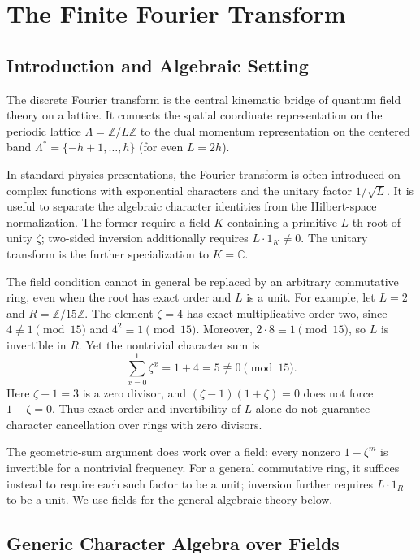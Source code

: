\chapter{The Finite Fourier Transform}
\label{ch:fourier}

\section{Introduction and Algebraic Setting}

The discrete Fourier transform is the central kinematic bridge of quantum field theory on a lattice. It connects the spatial coordinate representation on the periodic lattice $\Lambda = \mathbb{Z}/L\mathbb{Z}$ to the dual momentum representation on the centered band $\Lambda^* = \{-h+1, \dots, h\}$ (for even $L = 2h$).

In standard physics presentations, the Fourier transform is often introduced on complex functions with exponential characters and the unitary factor $1/\sqrt{L}$. It is useful to separate the algebraic character identities from the Hilbert-space normalization. The former require a field $K$ containing a primitive $L$-th root of unity $\zeta$; two-sided inversion additionally requires $L\cdot1_K\ne0$. The unitary transform is the further specialization to $K=\mathbb C$.

The field condition cannot in general be replaced by an arbitrary commutative ring, even when the root has exact order and $L$ is a unit. For example, let $L=2$ and $R=\mathbb Z/15\mathbb Z$. The element $\zeta=4$ has exact multiplicative order two, since $4\not\equiv1\pmod{15}$ and $4^2\equiv1\pmod{15}$. Moreover, $2\cdot8\equiv1\pmod{15}$, so $L$ is invertible in $R$. Yet the nontrivial character sum is
\begin{equation}
\sum_{x=0}^{1}\zeta^x=1+4=5\not\equiv0\pmod{15}.
\end{equation}
Here $\zeta-1=3$ is a zero divisor, and $(\zeta-1)(1+\zeta)=0$ does not force $1+\zeta=0$. Thus exact order and invertibility of $L$ alone do not guarantee character cancellation over rings with zero divisors.

The geometric-sum argument does work over a field: every nonzero $1-\zeta^m$ is invertible for a nontrivial frequency. For a general commutative ring, it suffices instead to require each such factor to be a unit; inversion further requires $L\cdot1_R$ to be a unit. We use fields for the general algebraic theory below.

\section{Generic Character Algebra over Fields}

